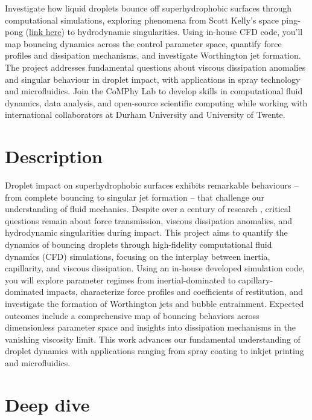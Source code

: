 \documentclass[11pt]{article}
\begin{document}
\begin{tcolorbox}[colback=mgray,colframe=mpurple,title=TL;DR]
	Investigate how liquid droplets bounce off superhydrophobic surfaces through computational simulations, exploring phenomena from Scott Kelly's space ping-pong (\href{https://www.youtube.com/watch?v=TLbhrMCM4_0}{link here}) to hydrodynamic singularities. Using in-house CFD code, you'll map bouncing dynamics across the control parameter space, quantify force profiles and dissipation mechanisms, and investigate Worthington jet formation. The project addresses fundamental questions about viscous dissipation anomalies and singular behaviour in droplet impact, with applications in spray technology and microfluidics. Join the CoMPhy Lab to develop skills in computational fluid dynamics, data analysis, and open-source scientific computing while working with international collaborators at Durham University and University of Twente.
\end{tcolorbox}

\section*{Description}


Droplet impact on superhydrophobic surfaces exhibits remarkable behaviours -- from complete bouncing to singular jet formation -- that challenge our understanding of fluid mechanics. Despite over a century of research \citep{worthington1877xxviii,sanjayUnifyingTheoryScaling2025}, critical questions remain about force transmission, viscous dissipation anomalies, and hydrodynamic singularities during impact. 
This project aims to quantify the dynamics of bouncing droplets through high-fidelity computational fluid dynamics (CFD) simulations, focusing on the interplay between inertia, capillarity, and viscous dissipation. Using an in-house developed simulation code, you will explore parameter regimes from inertial-dominated to capillary-dominated impacts, characterize force profiles and coefficients of restitution, and investigate the formation of Worthington jets and bubble entrainment. Expected outcomes include a comprehensive map of bouncing behaviors across dimensionless parameter space and insights into dissipation mechanisms in the vanishing viscosity limit. This work advances our fundamental understanding of droplet dynamics with applications ranging from spray coating to inkjet printing and microfluidics.

\section*{Deep dive}
\end{document}
